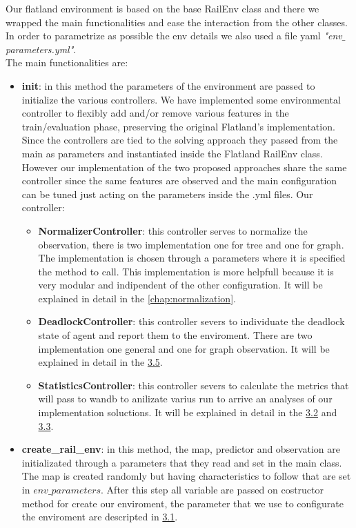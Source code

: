 Our flatland environment is based on the base RailEnv class and there we wrapped the main functionalities and ease the interaction from the other classes. In order to parametrize as possible the env details we also used a file yaml \textit{"env$\_$parameters.yml"}.\\
The main functionalities are:
\begin{itemize}
\item \textbf{init}: in this method the parameters of the environment are passed to initialize the various controllers. We have implemented some environmental controller to flexibly add and/or remove various features in the train/evaluation phase, preserving the original Flatland’s implementation. Since the controllers are tied to the solving approach they passed from the main as parameters and instantiated inside the Flatland RailEnv class. However our implementation of the two proposed approaches share the same controller since the same features are observed and the main configuration can be tuned just acting on the parameters inside the .yml files.
Our controller:
\begin{itemize}
	\item \textbf{NormalizerController}: this controller serves to normalize the observation, there is two implementation one for tree and one for graph. The implementation is chosen through a parameters where it is specified the method to call. This implementation is more helpfull because it is very modular and indipendent of the other configuration. It will be explained in detail in the \autoref{chap:normalization}.
	\item \textbf{DeadlockController}: this controller severs to individuate the deadlock state of agent and report them to the enviroment. There are two implementation one general and one for graph observation. It will be explained in detail in the \hyperref[sec:deadlockController]{3.5}.
	\item \textbf{StatisticsController}: this controller severs to calculate the metrics that will pass to wandb to anilizate varius run to arrive an analyses of our implementation soluctions. It will be explained in detail in the \hyperref[sec:metrics]{3.2} and \hyperref[sec:evaluation]{3.3}.
\end{itemize}
\item \textbf{create\_rail\_env}: in this method, the map, predictor and observation are initializated through a parameters that they read and set in the main class. The map is created randomly but having characteristics to follow that are set in $env\_parameters$. After this step all variable are passed on costructor method for create our enviroment, the parameter that we use to configurate the enviroment are descripted in \hyperref[sec:ourParameters]{3.1}.

\end{itemize}
